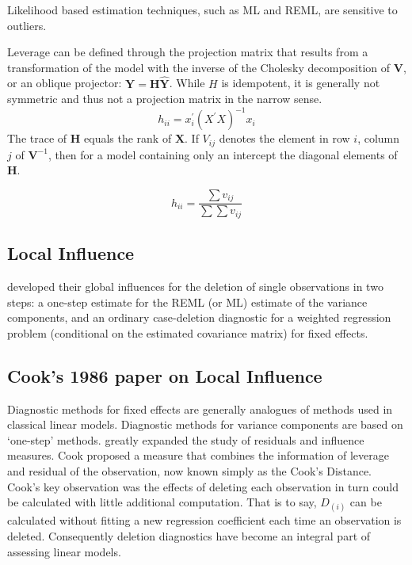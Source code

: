 \documentclass[12pt, a4paper]{report}
\theoremstyle{plain}
\theoremstyle{definition}
\theoremstyle{remark}
\begin{document}
	

Likelihood based estimation techniques, such as ML and REML, are sensitive to outliers.
	
	Leverage can be defined through the projection matrix that results from a transformation of the model with the inverse of the Cholesky decomposition of $\boldsymbol{V}$, or an oblique projector:	$\boldsymbol{Y} = \boldsymbol{H}\boldsymbol{\hat{Y}}$.
	While $H$ is idempotent, it is generally not symmetric and thus not a projection matrix in the narrow sense.
	\[ h_{ii} = x^{\prime}_{i}(X^{\prime}X)^{-1}x_{i} \]
	The trace of $\boldsymbol{H}$ equals the rank of $\boldsymbol{X}$.
	If $V_{ij}$ denotes the element in row $i$, column $j$ of $\boldsymbol{V}^{-1}$, then for a model containing only an intercept the diagonal elements of $\boldsymbol{H}$.
	
	\[ h_{ii} = \frac{\sum v_{ij}}{\sum \sum v_{ij}} \]
	
	
\subsection{Local Influence}

\citet{Christensen} developed their global influences for the deletion of single observations in two steps: a one-step estimate for the REML (or ML) estimate of the variance components, and an ordinary case-deletion diagnostic for a weighted regression problem (conditional on the estimated covariance matrix) for fixed effects.





\subsection{Cook's 1986 paper on Local Influence}%
	
Diagnostic methods for fixed effects are generally analogues of methods used in classical linear models.
Diagnostic methods for variance components are based on `one-step' methods.	\citet{cook77} greatly expanded the study of residuals and influence measures. Cook proposed a measure that combines the information of leverage and residual of the observation, now known simply as the Cook's Distance.
Cook's key observation was the effects of deleting each observation in turn could be calculated with little additional computation. That is to say, $D_{(i)}$ can be calculated without fitting a new regression coefficient each time an observation is deleted. Consequently deletion diagnostics have become an integral part of assessing linear models.
\end{document}
